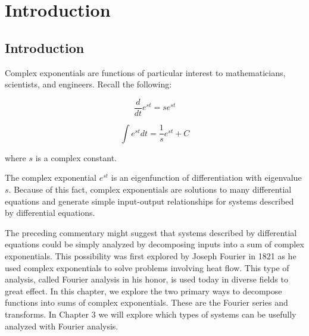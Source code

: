\chapter{Introduction}

\section{Introduction}
Complex exponentials are functions of particular interest to mathematicians, scientists, and engineers. Recall the following:

\begin{equation}
	\frac{d}{dt} e^{st} = s e^{st}
\end{equation}

\begin{equation}
	\int e^{st} dt = \frac{1}{s} e^{st} + C
\end{equation}

where $s$ is a complex constant.

The complex exponential $e^{st}$ is an eigenfunction of differentiation with eigenvalue $s$. Because of this fact, complex exponentials are solutions to many differential equations and generate simple input-output relationships for systems described by differential equations.

The preceding commentary might suggest that systems described by differential equations could be simply analyzed by decomposing inputs into a sum of complex exponentials. This possibility was first explored by Joseph Fourier in 1821 as he used complex exponentials to solve problems involving heat flow. This type of analysis, called Fourier analysis in his honor, is used today in diverse fields to great effect.
In this chapter, we explore the two primary ways to decompose functions into sums of complex exponentials. These are the Fourier series and transforms. In Chapter 3 we will explore which types of systems can be usefully analyzed with Fourier analysis.
